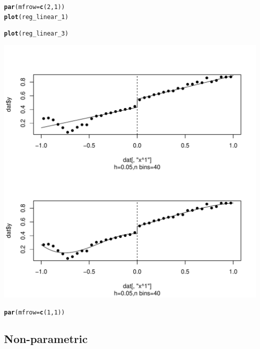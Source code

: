 \documentclass[english,nojss]{jss}\usepackage{graphicx, color}
\makeatletter
\def\maxwidth{ %
  \ifdim\Gin@nat@width>\linewidth
    \linewidth
  \else
    \Gin@nat@width
  \fi
}
\newcommand{\hlfunctioncall}[1]{\textcolor[rgb]{0.501960784313725,0,0.329411764705882}{\textbf{#1}}}%
\newenvironment{kframe}{%
 \def\at@end@of@kframe{}%
 \ifinner\ifhmode%
  \def\at@end@of@kframe{\end{minipage}}%
  \begin{minipage}{\columnwidth}%
 \fi\fi%
 \def\FrameCommand##1{\hskip\@totalleftmargin \hskip-\fboxsep
 \colorbox{shadecolor}{##1}\hskip-\fboxsep
     \hskip-\linewidth \hskip-\@totalleftmargin \hskip\columnwidth}%
 \MakeFramed {\advance\hsize-\width
   \@totalleftmargin\z@ \linewidth\hsize
   \@setminipage}}%
 {\par\unskip\endMakeFramed%
 \at@end@of@kframe}
\newenvironment{knitrout}{}{} %
\makeatother
\begin{document}
\begin{knitrout}
\color{fgcolor}\begin{kframe}
\begin{alltt}
\hlfunctioncall{par}(mfrow = \hlfunctioncall{c}(2, 1))
\hlfunctioncall{plot}(reg_linear_1)
\end{alltt}


{\ttfamily\noindent\color{warningcolor}{\#\# Warning: font width unknown for character 0x9}}\begin{alltt}
\hlfunctioncall{plot}(reg_linear_3)
\end{alltt}


{\ttfamily\noindent\color{warningcolor}{\#\# Warning: font width unknown for character 0x9}}\end{kframe}
\includegraphics[width=\maxwidth]{figure/unnamed-chunk-9} 
\begin{kframe}\begin{alltt}
\hlfunctioncall{par}(mfrow = \hlfunctioncall{c}(1, 1))
\end{alltt}
\end{kframe}
\end{knitrout}



\subsection{Non-parametric}
\end{document}
